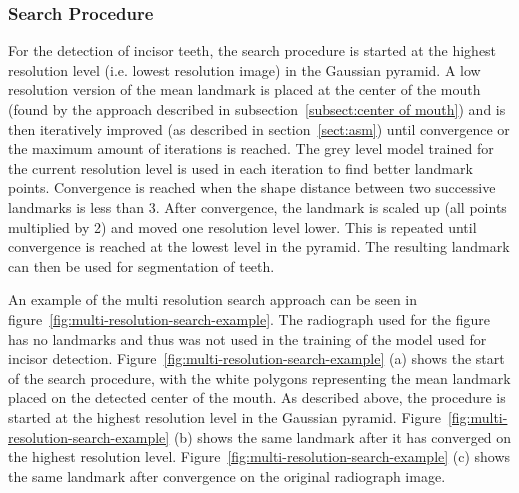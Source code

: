 \documentclass[a4paper]{article}
\begin{document}
\subsubsection{Search Procedure}
For the detection of incisor teeth, the search procedure is started at the highest resolution level (i.e. lowest resolution image) in the Gaussian pyramid.
A low resolution version of the mean landmark is placed at the center of the mouth (found by the approach described in subsection~\ref{subsect:center of mouth}) and is then iteratively improved (as described in section~\ref{sect:asm}) until convergence or the maximum amount of iterations is reached.
The grey level model trained for the current resolution level is used in each iteration to find better landmark points.
Convergence is reached when the shape distance between two successive landmarks is less than 3.
After convergence, the landmark is scaled up (all points multiplied by 2) and moved one resolution level lower.
This is repeated until convergence is reached at the lowest level in the pyramid.
The resulting landmark can then be used for segmentation of teeth.
\bigskip 

An example of the multi resolution search approach can be seen in figure~\ref{fig:multi-resolution-search-example}.
The radiograph used for the figure has no landmarks and thus was not used in the training of the model used for incisor detection. 
Figure~\ref{fig:multi-resolution-search-example} (a) shows the start of the search procedure, with the white polygons representing the mean landmark placed on the detected center of the mouth. 
As described above, the procedure is started at the highest resolution level in the Gaussian pyramid. 
Figure~\ref{fig:multi-resolution-search-example} (b) shows the same landmark after it has converged on the highest resolution level. 
Figure~\ref{fig:multi-resolution-search-example} (c) shows the same landmark after convergence on the original radiograph image.
\end{document}
